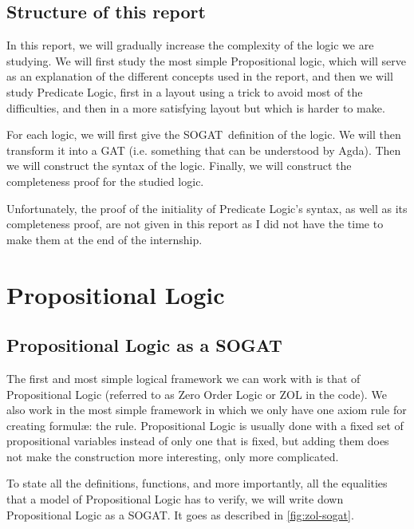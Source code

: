 \documentclass[10pt,a4paper]{article}
\begin{document}
		\subsection{Structure of this report}
		
			In this report, we will gradually increase the complexity of the logic we are studying. We will first study the most simple Propositional logic, which will serve as an explanation of the different concepts used in the report, and then we will study Predicate Logic, first in a layout using a trick to avoid most of the difficulties, and then in a more satisfying layout but which is harder to make.
			
			For each logic, we will first give the SOGAT definition of the logic. We will then transform it into a GAT (i.e. something that can be understood by Agda). Then we will construct the syntax of the logic. Finally, we will construct the completeness proof for the studied logic.
			
			Unfortunately, the proof of the initiality of Predicate Logic's syntax, as well as its completeness proof, are not given in this report as I did not have the time to make them at the end of the internship.
			
	\section{Propositional Logic}
		\subsection{Propositional Logic as a SOGAT}
		
			The first and most simple logical framework we can work with is that of Propositional Logic (referred to as Zero Order Logic or ZOL in the code). We also work in the most simple framework in which we only have one axiom rule for creating formulæ: the \iotAgda{} rule. Propositional Logic is usually done with a fixed set of propositional variables instead of only one that is fixed, but adding them does not make the construction more interesting, only more complicated.
			
			To state all the definitions, functions, and more importantly, all the equalities that a model of Propositional Logic has to verify, we will write down Propositional Logic as a SOGAT. It goes as described in \autoref{fig:zol-sogat}.
			
\end{document}
